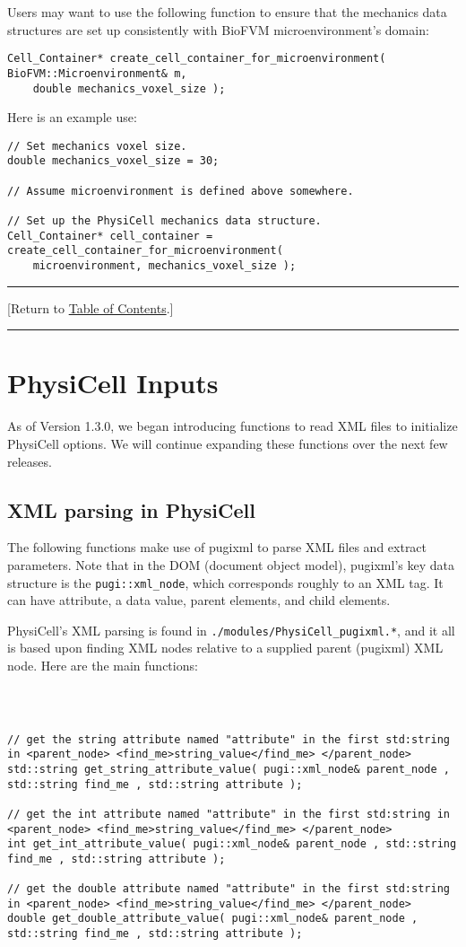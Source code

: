 \documentclass[12pt]{article}
\renewcommand{\v}{\verb}
\newcommand{\TOClink}{\begin{center}\hrule\vskip-10pt\phantom{.}\hfill[Return to \hyperlink{TOC}{Table of Contents}.]\hfill\phantom{.}\vskip3pt\hrule\end{center}}
\begin{document}
Users may want to use the following function to ensure that the mechanics 
data structures are set up consistently with BioFVM microenvironment's 
domain:

\begin{verbatim}
Cell_Container* create_cell_container_for_microenvironment( BioFVM::Microenvironment& m, 
    double mechanics_voxel_size );
\end{verbatim}

Here is an example use: 
\begin{verbatim}
// Set mechanics voxel size. 
double mechanics_voxel_size = 30; 

// Assume microenvironment is defined above somewhere. 

// Set up the PhysiCell mechanics data structure. 
Cell_Container* cell_container = create_cell_container_for_microenvironment(
    microenvironment, mechanics_voxel_size );
\end{verbatim}

\TOClink

\section{PhysiCell Inputs}
As of Version 1.3.0, we began introducing functions to read XML files to initialize 
PhysiCell options. We will continue expanding these functions over the next few 
releases. 

\subsection{XML parsing in PhysiCell}
\label{sec:XML}
The following functions make use of pugixml \cite{ref:pugixml} to parse XML files and 
extract parameters. Note that in the DOM (document object model), pugixml's key data 
structure is the \v|pugi::xml_node|, which corresponds roughly to an XML tag. It 
can have attribute, a data value, parent elements, and child elements. 

PhysiCell's XML parsing is found in \v|./modules/PhysiCell_pugixml.*|, and it all 
is based upon finding XML nodes relative to a supplied parent (pugixml) XML node. 
Here are the main functions: 

\begin{verbatim}



// get the string attribute named "attribute" in the first std:string in <parent_node> <find_me>string_value</find_me> </parent_node> 
std::string get_string_attribute_value( pugi::xml_node& parent_node , std::string find_me , std::string attribute ); 

// get the int attribute named "attribute" in the first std:string in <parent_node> <find_me>string_value</find_me> </parent_node> 
int get_int_attribute_value( pugi::xml_node& parent_node , std::string find_me , std::string attribute ); 

// get the double attribute named "attribute" in the first std:string in <parent_node> <find_me>string_value</find_me> </parent_node> 
double get_double_attribute_value( pugi::xml_node& parent_node , std::string find_me , std::string attribute ); 
\end{verbatim}
\end{document}
